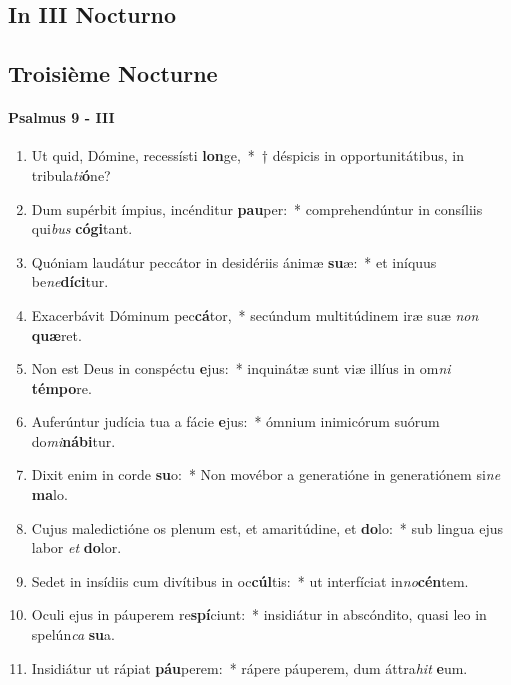 \documentclass[twoside]{article}
\begin{document}
\begin{paracol}[1]{2}
\subsection{In III Nocturno}

\switchcolumn

\subsection{Troisième Nocturne}

\switchcolumn*

\paragraph{Psalmus 9 - III}


\begin{enumerate}[wide, itemsep=0mm, labelwidth=!, labelindent=0pt, label=\color{gregoriocolor}\theenumi]
\item Ut quid, Dómine, recessísti \textbf{lon}ge,~*~† déspicis in opportunitátibus, in tribula\textit{ti}\textbf{ó}ne?
\item Dum supérbit ímpius, incénditur \textbf{pau}per:~* comprehendúntur in consíliis qui\textit{bus} \textbf{có}\textbf{gi}tant.
\item Quóniam laudátur peccátor in desidériis ánimæ \textbf{su}æ:~* et iníquus be\textit{ne}\textbf{dí}\textbf{ci}tur.
\item Exacerbávit Dóminum pec\textbf{cá}tor,~* secúndum multitúdinem iræ suæ \textit{non} \textbf{quæ}ret.
\item Non est Deus in conspéctu \textbf{e}jus:~* inquinátæ sunt viæ illíus in om\textit{ni} \textbf{tém}\textbf{po}re.
\item Auferúntur judícia tua a fácie \textbf{e}jus:~* ómnium inimicórum suórum do\textit{mi}\textbf{ná}\textbf{bi}tur.
\item Dixit enim in corde \textbf{su}o:~* Non movébor a generatióne in generatiónem si\textit{ne} \textbf{ma}lo.
\item Cujus maledictióne os plenum est, et amaritúdine, et \textbf{do}lo:~* sub lingua ejus labor \textit{et} \textbf{do}lor.
\item Sedet in insídiis cum divítibus in oc\textbf{cúl}tis:~* ut interfíciat in\textit{no}\textbf{cén}tem.
\item Oculi ejus in páuperem re\textbf{spí}ciunt:~* insidiátur in abscóndito, quasi leo in spelún\textit{ca} \textbf{su}a.
\item Insidiátur ut rápiat \textbf{páu}perem:~* rápere páuperem, dum áttra\textit{hit} \textbf{e}um.

\end{enumerate}
\end{paracol}
\end{document}

